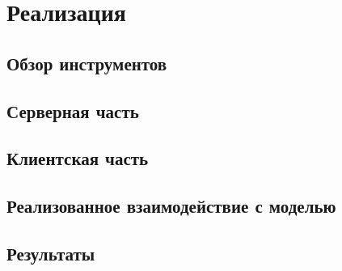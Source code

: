 ﻿\section{Реализация}

\subsection{Обзор инструментов}
\lipsum[4]

\subsection{Серверная часть}
\lipsum[5]

\subsection{Клиентская часть}
\lipsum[6]

\subsection{Реализованное взаимодействие с моделью}
\lipsum[7]

\subsection{Результаты}
\lipsum[8]